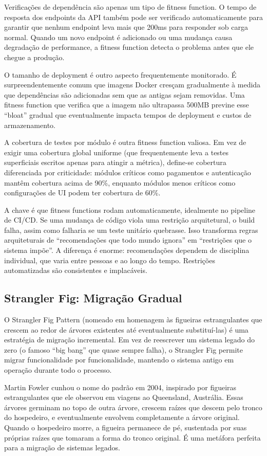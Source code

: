 Verificações de dependência são apenas um tipo de fitness function. O tempo de
resposta dos endpoints da API também pode
ser verificado automaticamente para garantir que nenhum endpoint leva mais
que 200ms para responder sob carga normal. Quando um novo endpoint é adicionado
ou uma mudança causa degradação de performance, a fitness function detecta o
problema antes que ele chegue a produção.

O tamanho de deployment é outro aspecto frequentemente monitorado. É surpreendentemente
comum que imagens Docker cresçam gradualmente à medida que dependências são
adicionadas sem que as antigas sejam removidas. Uma fitness function que verifica
que a imagem não ultrapassa 500MB previne esse ``bloat'' gradual que eventualmente
impacta tempos de deployment e custos de armazenamento.

A cobertura de testes por módulo é outra fitness function valiosa. Em vez de
exigir uma cobertura global uniforme (que frequentemente leva a testes
superficiais escritos apenas para atingir a métrica), define-se cobertura
diferenciada por criticidade: módulos críticos como pagamentos e autenticação
mantêm cobertura acima de 90\%, enquanto módulos menos críticos como
configurações de UI podem ter cobertura de 60\%.

A chave é que fitness functions rodam automaticamente, idealmente no pipeline
de CI/CD. Se uma mudança de código viola uma restrição arquitetural, o build
falha, assim como falharia se um teste unitário quebrasse. Isso transforma
regras arquiteturais de ``recomendações que todo mundo ignora'' em
``restrições que o sistema impõe''. A diferença é enorme: recomendações
dependem de disciplina individual, que varia entre pessoas e ao longo do
tempo. Restrições automatizadas são consistentes e implacáveis.

\subsection{Strangler Fig: Migração Gradual}

O Strangler Fig Pattern (nomeado em homenagem às figueiras estrangulantes que
crescem ao redor de árvores existentes até eventualmente substituí-las) é uma
estratégia de migração incremental. Em vez de reescrever um sistema legado do
zero (o famoso ``big bang'' que quase sempre falha), o Strangler Fig permite
migrar funcionalidade por funcionalidade, mantendo o sistema antigo em operação
durante todo o processo.

Martin Fowler cunhou o nome do padrão em 2004, inspirado por
figueiras estrangulantes que ele observou em viagens ao Queensland,
Austrália. Essas árvores germinam no topo de outra árvore, crescem raízes
que descem pelo tronco do hospedeiro, e eventualmente envolvem completamente
a árvore original. Quando o hospedeiro morre, a figueira permanece de pé,
sustentada por suas próprias raízes que tomaram a forma do tronco original.
É uma metáfora perfeita para a migração de sistemas legados.

